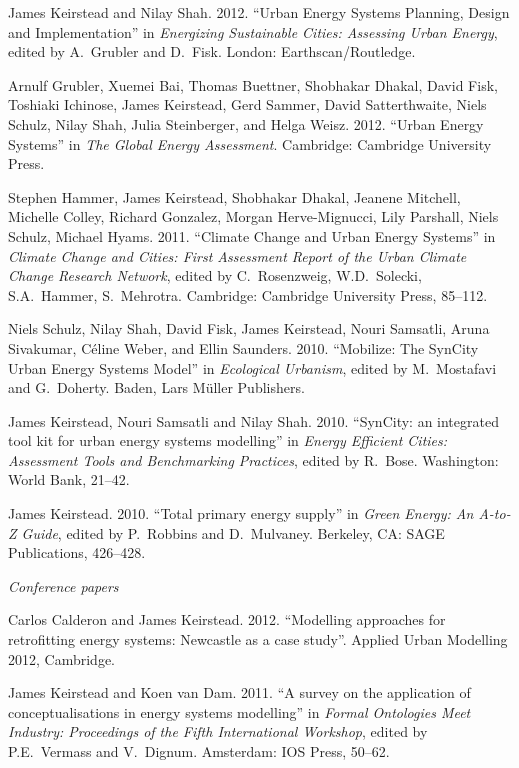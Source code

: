 \documentclass[11pt,a4paper]{article}
\begin{document}
\ind James Keirstead and Nilay Shah. 2012. ``Urban Energy Systems Planning, Design and Implementation'' in \emph{Energizing Sustainable Cities: Assessing Urban Energy}, edited by A.\ Grubler and D.\ Fisk. London: Earthscan/Routledge.

\ind Arnulf Grubler, Xuemei Bai, Thomas Buettner, Shobhakar Dhakal, David Fisk, Toshiaki Ichinose, James Keirstead, Gerd Sammer, David Satterthwaite, Niels Schulz, Nilay Shah, Julia Steinberger, and Helga Weisz. 2012. ``Urban Energy Systems'' in \emph{The Global Energy Assessment}. Cambridge: Cambridge University Press.

\ind Stephen Hammer, James Keirstead, Shobhakar Dhakal, Jeanene Mitchell, Michelle Colley, Richard Gonzalez, Morgan Herve-Mignucci, Lily Parshall, Niels Schulz, Michael Hyams. 2011. ``Climate Change and Urban Energy Systems'' in \emph{Climate Change and Cities: First Assessment Report of the Urban Climate Change Research Network}, edited by C.\ Rosenzweig, W.D.\ Solecki, S.A.\ Hammer, S.\ Mehrotra.  Cambridge: Cambridge University Press, 85--112.

\ind Niels Schulz, Nilay Shah, David Fisk, James Keirstead, Nouri Samsatli, Aruna Sivakumar, C\'{e}line Weber, and Ellin Saunders. 2010. ``Mobilize: The SynCity Urban Energy Systems Model'' in \emph{Ecological Urbanism}, edited by M.\ Mostafavi and G.\ Doherty.  Baden, Lars M\"{u}ller Publishers.

\ind James Keirstead, Nouri Samsatli and Nilay Shah. 2010. ``SynCity: an integrated tool kit for urban energy systems modelling'' in \emph{Energy Efficient Cities: Assessment Tools and Benchmarking Practices}, edited by R.\ Bose.  Washington: World Bank, 21--42.

\ind James Keirstead. 2010. ``Total primary energy supply'' in \emph{Green Energy: An A-to-Z Guide}, edited by P.\ Robbins and D.\ Mulvaney.  Berkeley, CA: SAGE Publications, 426--428.


\bigskip 

\noindent\emph{Conference papers \vspace{0.01in}}

\ind Carlos Calderon and James Keirstead. 2012. ``Modelling approaches for retrofitting energy systems: Newcastle as a case study''.  Applied Urban Modelling 2012, Cambridge.

\ind James Keirstead and Koen van Dam. 2011. ``A survey on the application of conceptualisations in energy systems modelling'' in \emph{Formal Ontologies Meet Industry: Proceedings of the Fifth International Workshop}, edited by P.E.\ Vermass and V.\ Dignum.  Amsterdam: IOS Press, 50--62.
\end{document}
